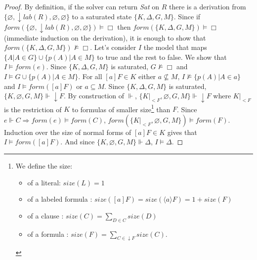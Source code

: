 \documentclass[a4paper,11pt]{article}
\newcommand{\F}{\mathit{form}}
\newcommand{\T}{\mathit{lab}}
\newcommand{\Si}{\mathit{size}}
\begin{document}
\begin{proof}
By definition, if the solver can return \emph{Sat} on $R$ there is a derivation from
$\{\varnothing,\downarrow\T(R),\varnothing,\varnothing\}$ to a saturated state $\{K,\Delta,G,M\}$. Since
if $\F(\{\varnothing,\downarrow\T(R),\varnothing,\varnothing\})\vDash\Box$ then
$\F(\{K,\Delta,G,M\})\vDash\Box$ (immediate induction on the derivation), it is enough to show that
$\F(\{K,\Delta,G,M\})\nvDash\Box$.
Let's consider $I$ the model that maps $\{A|A\in G\}\cup\{p(A)|A\in M\}$ to true and the rest to false.
We show that $I\vDash\F(e)$. Since $\{K,\Delta,G,M\}$ is saturated, $G\nvDash\Box$ and
$I\vDash G\cup\{p(A)|A\in M\}$. For all $[a]F\in K$ either $a\nsubseteq M$, $I\nvDash\{p(A)|A\in a\}$
and $I\vDash\F([a]F)$ or $a\subseteq M$. Since $\{K,\Delta,G,M\}$ is saturated,
$\{K,\varnothing,G,M\}\Vdash\downarrow F$. By construction of $\Vdash$, $\{K|_{<F},\varnothing,G,M\}
\Vdash\downarrow F$ where
$K|_{<F}$ is the restriction of $K$ to formulas of smaller size\footnote{
We define the size:
\begin{itemize}
 \item of a literal: $\Si(L)=1$
 \item of a labeled formula : $\Si([a]F)=\Si(\langle a\rangle F)=1+\Si(F)$
 \item of a clause : $\Si(C)=\sum_{D\in C}\Si(D)$
 \item of a formula : $\Si(F)=\sum_{C\in\downarrow F}\Si(C)$.
\end{itemize}}
than $F$. Since $e\Vdash C\Rightarrow\F(e)\vDash\F(C)$,
$\F(\{K|_{<F},\varnothing,G,M\})\vDash\F(F)$. Induction over
the size of normal forms of $[a]F\in K$ gives that $I\vDash\F([a]F)$.
And since $\{K,\varnothing,G,M\}\Vdash\Delta$, $I\vDash\Delta$.
\end{proof}
\end{document}
